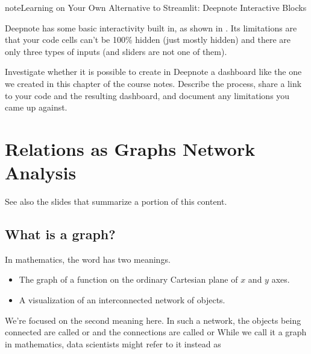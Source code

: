 \documentclass[letterpaper,10pt,english]{jupyterBook}
\begin{document}
\begin{sphinxadmonition}{note}{Learning on Your Own \sphinxhyphen{} Alternative to Streamlit: Deepnote Interactive Blocks}

\sphinxAtStartPar
Deepnote has some basic interactivity built in, as shown in .  Its limitations are that your code cells can’t be 100\% hidden (just mostly hidden) and there are only three types of inputs (and sliders are not one of them).

\sphinxAtStartPar
Investigate whether it is possible to create in Deepnote a dashboard like the one we created in this chapter of the course notes.  Describe the process, share a link to your code and the resulting dashboard, and document any limitations you came up against.
\end{sphinxadmonition}


\chapter{Relations as Graphs \sphinxhyphen{} Network Analysis}
\label{\detokenize{chapter-15-networks:relations-as-graphs-network-analysis}}\label{\detokenize{chapter-15-networks::doc}}
\sphinxAtStartPar
See also the slides that summarize a portion of this content.


\section{What is a graph?}
\label{\detokenize{chapter-15-networks:what-is-a-graph}}
\sphinxAtStartPar
In mathematics, the word  has two meanings.
\begin{itemize}
\item {} 
\sphinxAtStartPar
{} The graph of a function on the ordinary Cartesian plane of \(x\) and \(y\) axes.

\item {} 
\sphinxAtStartPar
{} A visualization of an interconnected network of objects.

\end{itemize}

\sphinxAtStartPar
We’re focused on the second meaning here.  In such a network, the objects being connected are called  or  and the connections are called   or   While we call it a graph in mathematics, data scientists might refer to it instead as 
\end{document}
